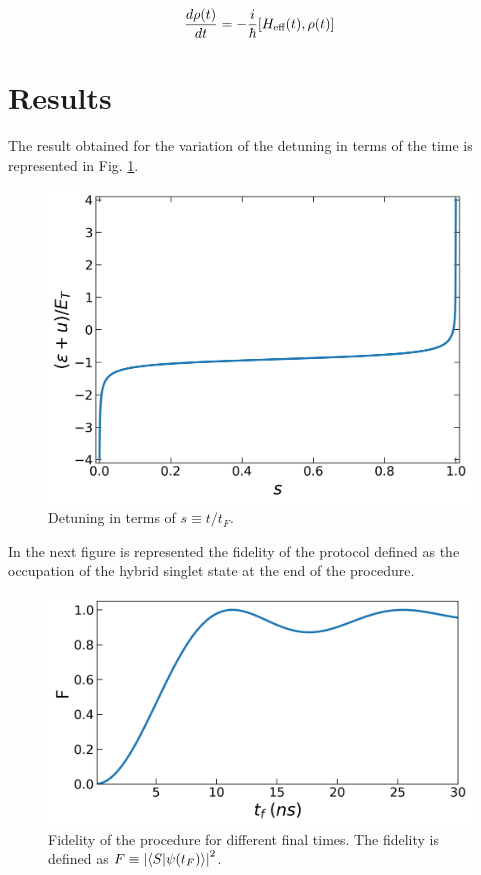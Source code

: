 \documentclass[aip,rsi,amsmath,amssymb,reprint, english]{revtex4-1}
\begin{document}
\begin{equation}
	\dfrac{d \rho(t)}{d t}=-\dfrac{i}{\hbar}\comm{H_{\text{eff}}(t)}{\rho(t)}
\end{equation}

\section{Results}

The result obtained for the variation of the detuning in terms of the time is represented in Fig. \ref{fig:detuning_1}.

\begin{figure}[h!]
	\centering
	\includegraphics[width=\linewidth]{detuning_1}
	\caption{Detuning in terms of $s\equiv t/t_F$.}
	\label{fig:detuning_1}
\end{figure}

In the next figure is represented the fidelity of the protocol defined as the occupation of the hybrid singlet state at the end of the procedure.

\begin{figure}[h!]
	\centering
	\includegraphics[width=\linewidth]{fidelity_1}
	\caption{Fidelity of the procedure for different final times. The fidelity is defined as $F\equiv \abs{\braket{S}{\psi(t_F)}}^2$.}
	\label{fig:fidelity_1}
\end{figure}
\end{document}
